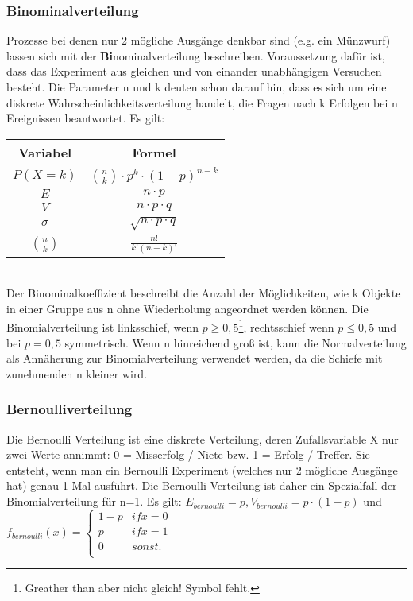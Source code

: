 \documentclass{scrreprt}
\begin{document}
\subsubsection{Binominalverteilung}\label{Binominalverteilung}
Prozesse bei denen nur 2 mögliche Ausgänge denkbar sind (e.g. ein Münzwurf) lassen sich mit der \textbf{Bi}nominalverteilung beschreiben.
Voraussetzung dafür ist, dass das Experiment aus gleichen und von einander unabhängigen Versuchen besteht. Die Parameter n und k deuten schon darauf hin, dass es sich um eine diskrete Wahrscheinlichkeitsverteilung handelt, die Fragen nach k Erfolgen bei n Ereignissen beantwortet. Es gilt:
\hspace{0.3cm}
    \begin{tabular}{|c|c|}
      \hline
      Variabel & Formel \\
      \hline
      $P(X=k)$ & $\binom{n}{k} \cdot p^k \cdot (1-p)^{n-k}$ \\
      $E$ & $n \cdot p$ \\
      $V$ & $n \cdot p \cdot q$ \\
      $\sigma$ & $\sqrt{n \cdot p \cdot q}$ \\
      $\binom{n}{k}$ & $\frac{n!}{k!(n-k)!}$ \\
      \hline
    \end{tabular}
\hfill\break
\\
Der Binominalkoeffizient beschreibt die Anzahl der Möglichkeiten, wie k Objekte in einer Gruppe aus n ohne Wiederholung angeordnet werden können. Die Binomialverteilung ist linksschief, wenn $p \geq 0,5$\footnote{Greather than aber nicht gleich! Symbol fehlt.}, rechtsschief wenn $p \leq 0,5$ und bei $p = 0,5$ symmetrisch. Wenn n hinreichend groß ist, kann die Normalverteilung als Annäherung zur Binomialverteilung verwendet werden, da die Schiefe mit zunehmenden n kleiner wird.
\subsubsection{Bernoulliverteilung}\label{Bernoulli}
Die Bernoulli Verteilung ist eine diskrete Verteilung, deren Zufallsvariable X nur zwei Werte annimmt: 0 = Misserfolg / Niete bzw. 1 = Erfolg / Treffer. Sie entsteht, wenn man ein Bernoulli Experiment (welches nur 2 mögliche Ausgänge hat) genau 1 Mal ausführt. Die Bernoulli Verteilung ist daher ein Spezialfall der Binomialverteilung für n=1. Es gilt: $E_{bernoulli}=p, V_{bernoulli}=p\cdot (1-p)$ und $f_{bernoulli}(x)=\begin{cases}
    1-p & {if x=0} \\
    p & {if x=1} \\
    0 & {sonst.} \\
\end{cases}$
\end{document}
